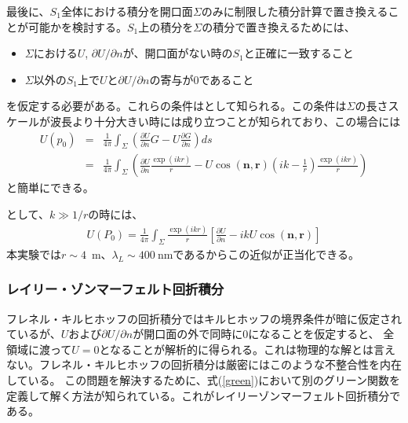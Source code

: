 \documentclass[a4paper,11pt,uplatex]{jsbook}
\begin{document}
最後に、$S_1$全体における積分を開口面$\Sigma$のみに制限した積分計算で置き換えることが可能かを検討する。$S_1$上の積分を$\Sigma$の積分で置き換えるためには、
\begin{itemize}
  \item $\Sigma$における$U$, $\partial U/\partial n$が、開口面がない時の$S_1$と正確に一致すること
  \item $\Sigma$以外の$S_1$上で$U$と$\partial U/\partial n$の寄与が0であること
\end{itemize}
を仮定する必要がある。これらの条件はとして知られる。この条件は$\Sigma$の長さスケールが波長より十分大きい時には成り立つことが知られており、この場合には
\begin{eqnarray}
  U(p_0) &=& \frac{1}{4\pi}\int_\Sigma \left( \frac{\partial U}{\partial n}G - U \frac{\partial G}{\partial n}\right)ds \\
  &=& \frac{1}{4\pi} \int_\Sigma \left( \frac{\partial U}{\partial n}\frac{\exp(ikr)}{r} - U \cos(\bm{n},\bm{r})\left(ik - \frac{1}{r}\right)\frac{\exp(ikr)}{r}\right)
\end{eqnarray}
と簡単にできる。

として、$k \gg 1/r$の時には、
\begin{eqnarray}
  U(P_0) = \frac{1}{4\pi}\int_\Sigma \frac{\exp(ikr)}{r}\left[\frac{\partial U}{\partial n} - ik U \cos(\bm{n},\bm{r})\right]
\end{eqnarray}
本実験では$r\sim 4$~m、$\lambda_L \sim 400~$nmであるからこの近似が正当化できる。

\subsubsection{レイリー・ゾンマーフェルト回折積分}
フレネル・キルヒホッフの回折積分ではキルヒホッフの境界条件が暗に仮定されているが、$U$および$\partial U/\partial n$が開口面の外で同時に0になることを仮定すると、
全領域に渡って$U=0$となることが解析的に得られる。これは物理的な解とは言えない。フレネル・キルヒホッフの回折積分は厳密にはこのような不整合性を内在している。
この問題を解決するために、式(\ref{green})において別のグリーン関数を定義して解く方法が知られている。これがレイリーゾンマーフェルト回折積分である。
\end{document}
